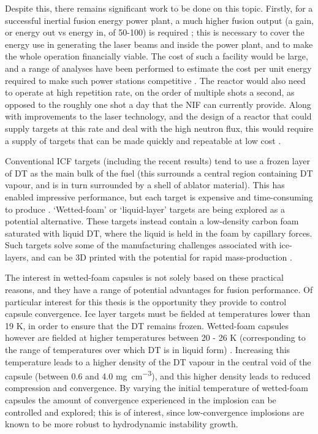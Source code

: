 Despite this, there remains significant work to be done on this topic. Firstly, for a successful inertial fusion energy power plant, a much higher fusion output (a gain, or energy out vs energy in, of 50-100) is required \cite{Campbell2017}; this is necessary to cover the energy use in generating the laser beams and inside the power plant, and to make the whole operation financially viable. The cost of such a facility would be large, and a range of analyses have been performed to estimate the cost per unit energy required to make such power stations competitive \cite{Tynan2020, Gi2020}. The reactor would also need to operate at high repetition rate, on the order of multiple shots a second, as opposed to the roughly one shot a day that the NIF can currently provide. Along with improvements to the laser technology, and the design of a reactor that could supply targets at this rate and deal with the high neutron flux, this would require a supply of targets that can be made quickly and repeatable at low cost \cite{Nuckolls2010}.

Conventional ICF targets (including the recent results) tend to use a frozen layer of DT as the main bulk of the fuel (this surrounds a central region containing DT vapour, and is in turn surrounded by a shell of ablator material). This has enabled impressive performance, but each target is expensive and time-consuming to produce \cite{Goncharov2020}. `Wetted-foam' or `liquid-layer' targets are being explored as a potential alternative. These targets instead contain a low-density carbon foam saturated with liquid DT, where the liquid is held in the foam by capillary forces. Such targets solve some of the manufacturing challenges associated with ice-layers, and can be 3D printed with the potential for rapid mass-production \cite{Olson2021}.

The interest in wetted-foam capsules is not solely based on these practical reasons, and they have a range of potential advantages for fusion performance. Of particular interest for this thesis is the opportunity they provide to control capsule convergence. Ice layer targets must be fielded at temperatures lower than 19 K, in order to ensure that the DT remains frozen. Wetted-foam capsules however are fielded at higher temperatures between 20 - 26 K (corresponding to the range of temperatures over which DT is in liquid form) \cite{Olson2016}. Increasing this temperature leads to a higher density of the DT vapour in the central void of the capsule (between 0.6 and 4.0 \unit{\milli\gram\per\centi\meter\cubed}), and this higher density leads to reduced compression and convergence. By varying the initial temperature of wetted-foam capsules the amount of convergence experienced in the implosion can be controlled and explored; this is of interest, since low-convergence implosions are known to be more robust to hydrodynamic instability growth.

